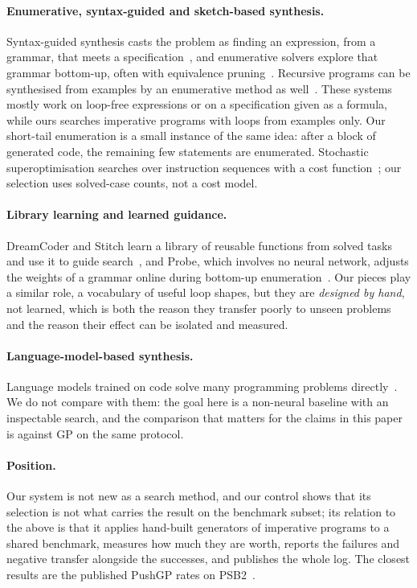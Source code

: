 \documentclass[sigconf,nonacm]{acmart}
\begin{document}
\paragraph{Enumerative, syntax-guided and sketch-based synthesis.}
Syntax-guided synthesis casts the problem as finding an expression, from a grammar, that meets a specification~\cite{alur2013sygus}, and
enumerative solvers explore that grammar bottom-up, often with equivalence pruning~\cite{gulwani2017program}. Recursive programs can be
synthesised from examples by an enumerative method as well~\cite{albarghouthi2013escher}. These systems mostly work on loop-free
expressions or on a specification given as a formula, while ours searches imperative programs with loops from examples only. Our
short-tail enumeration is a small instance of the same idea: after a block of generated code, the remaining few statements are enumerated.
Stochastic superoptimisation searches over instruction sequences with a cost function~\cite{schkufza2013stoke}; our selection uses
solved-case counts, not a cost model.

\paragraph{Library learning and learned guidance.}
DreamCoder and Stitch learn a library of reusable functions from solved tasks and use it to guide search~\cite{ellis2020dreamcoder,bowers2023stitch}, and Probe, which involves no neural network, adjusts the weights of a grammar online during bottom-up enumeration~\cite{barke2020probe}.
Our pieces play a similar role, a vocabulary of useful loop shapes, but they are \emph{designed by hand}, not learned, which is both the
reason they transfer poorly to unseen problems and the reason their effect can be isolated and measured.

\paragraph{Language-model-based synthesis.}
Language models trained on code solve many programming problems directly~\cite{chen2021codex}. We do not compare with them: the goal here is a
non-neural baseline with an inspectable search, and the comparison that matters for the claims in this paper is against GP on the same protocol.

\paragraph{Position.}
Our system is not new as a search method, and our control shows that its selection is not what carries the result on the benchmark subset; its relation to the above is that it applies hand-built generators of imperative programs to a
shared benchmark, measures how much they are worth, reports the failures and negative transfer alongside the successes, and publishes the whole log. The closest results are the
published PushGP rates on PSB2~\cite{helmuth2021psb2}.
\end{document}
